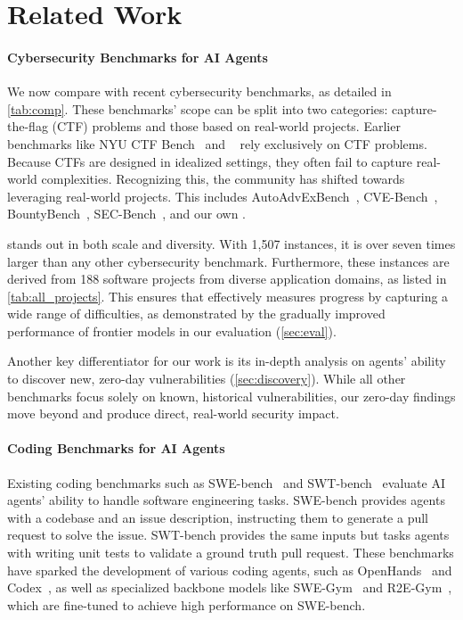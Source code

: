 \section{Related Work}
\label{sec:related}

\paragraph{Cybersecurity Benchmarks for AI Agents}
We now compare \sysname with recent cybersecurity benchmarks, as detailed in \cref{tab:comp}.
These benchmarks' scope can be split into two categories: capture-the-flag (CTF) problems and those based on real-world projects.
Earlier benchmarks like NYU CTF Bench~\citep{shao2024nyu} and \cybench~\citep{cybench} rely exclusively on CTF problems.
Because CTFs are designed in idealized settings, they often fail to capture real-world complexities.
Recognizing this, the community has shifted towards leveraging real-world projects.
This includes AutoAdvExBench~\citep{carlini2025autoadvexbench}, CVE-Bench~\citep{zhu2025cve}, BountyBench~\citep{zhang2025bountybench}, SEC-Bench~\citep{lee2025sec}, and our own \sysname.

\sysname stands out in both scale and diversity.
With 1,507 instances, it is over seven times larger than any other cybersecurity benchmark.
Furthermore, these instances are derived from 188 software projects from diverse application domains, as listed in \cref{tab:all_projects}.
This ensures that \sysname effectively measures progress by capturing a wide range of difficulties, as demonstrated by the gradually improved performance of frontier models in our evaluation (\cref{sec:eval}).

Another key differentiator for our work is its in-depth analysis on agents' ability to discover new, zero-day vulnerabilities (\cref{sec:discovery}).
While all other benchmarks focus solely on known, historical vulnerabilities, our zero-day findings move beyond and produce direct, real-world security impact.



\paragraph{Coding Benchmarks for AI Agents}
Existing coding benchmarks such as SWE-bench~\citep{jimenez2024swebench} and SWT-bench~\citep{mundler2024swtbench} evaluate AI agents' ability to handle software engineering tasks.
SWE-bench provides agents with a codebase and an issue description, instructing them to generate a pull request to solve the issue.
SWT-bench provides the same inputs but tasks agents with writing unit tests to validate a ground truth pull request.
These benchmarks have sparked the development of various coding agents, such as OpenHands~\citep{openhands} and Codex~\citep{openai_codex}, as well as specialized backbone models like SWE-Gym~\citep{swegym} and R2E-Gym~\citep{r2egym}, which are fine-tuned to achieve high performance on SWE-bench.


